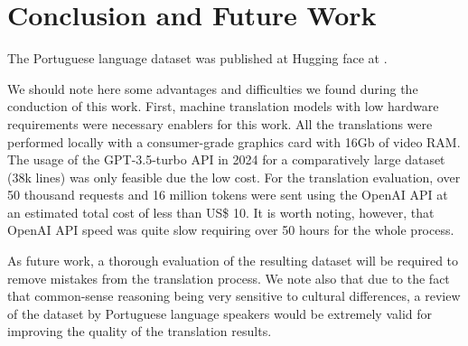 \documentclass{article}
\begin{document}
\section{Conclusion and Future Work}

The Portuguese language dataset was published at Hugging face at \cite{socialiqa_pt}. 

We should note here some advantages and difficulties we found during the
conduction of this work. First, machine translation models with low hardware
requirements were necessary enablers for this work. All the translations were
performed locally with a consumer-grade graphics card with 16Gb of video RAM.
The usage of the GPT-3.5-turbo API in 2024 for a comparatively large dataset
(38k lines) was only feasible due the low cost. For the translation evaluation,
over 50 thousand requests and 16 million tokens were sent using the OpenAI API
at an estimated total cost of less than US\$ 10. It is worth noting, however,
that OpenAI API speed was quite slow requiring over 50 hours for the whole
process.

As future work, a thorough evaluation of the resulting dataset will be required
to remove mistakes from the translation process. We note also that due to
the fact that common-sense reasoning being very sensitive to cultural
differences, a review of the dataset by Portuguese language speakers would be
extremely valid for improving the quality of the translation results.

\newpage


\end{document}
